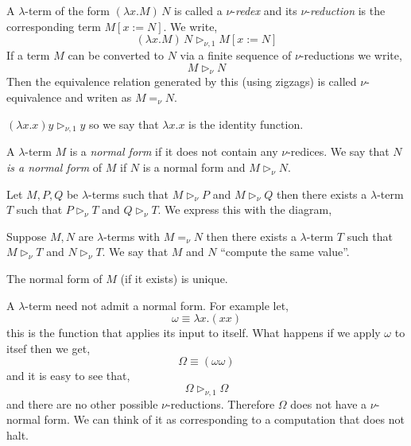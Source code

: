 \documentclass[12pt]{article}
\newcommand{\red}{\triangleright}
\newcommand{\bredo}{\red_{\nu,1}}
\newcommand{\bred}{\red_{\nu}}
\begin{document}
\begin{defn}
A $\lambda$-term of the form $(\lambda x.M) \, N$ is called a $\nu$-\textit{redex} and its $\nu$-\textit{reduction} is the corresponding term $M [x := N]$. We write,
\[ (\lambda x.M) \, N \bredo M [x := N] \]
If a term $M$ can be converted to $N$ via a finite sequence of $\nu$-reductions we write,
\[ M \bred N \]
Then the equivalence relation generated by this (using zigzags) is called $\nu$-equivalence and writen as $M =_\nu N$. 
\end{defn}

\begin{example}
$( \lambda x . x) y \bredo y$ so we say that $\lambda x . x$ is the identity function.
\end{example}

\begin{defn}
A $\lambda$-term $M$ is a \textit{normal form} if it does not contain any $\nu$-redices. We say that $N$ \textit{is a normal form} of $M$ if $N$ is a normal form and $M \bred N$.
\end{defn} 

\begin{theorem}
Let $M, P, Q$ be $\lambda$-terms such that $M \bred P$ and $M \bred Q$ then there exists a $\lambda$-term $T$ such that $P \bred T$ and $Q \bred T$. We express this with the diagram,
\begin{center}
\end{center}
\end{theorem} 

\begin{cor}
Suppose $M, N$ are $\lambda$-terms with $M =_\nu N$ then there exists a $\lambda$-term $T$ such that $M \bred T$ and $N \bred T$. We say that $M$ and $N$ ``compute the same value''.
\end{cor}

\begin{cor}
The normal form of $M$ (if it exists) is unique.
\end{cor}

\begin{example}
A $\lambda$-term need not admit a normal form. For example let,
\[ \omega \equiv \lambda x . (x x) \]
this is the function that applies its input to itself. What happens if we apply $\omega$ to itsef then we get,
\[ \Omega \equiv (\omega \omega) \]
and it is easy to see that,
\[ \Omega \bredo \Omega \]
and there are no other possible $\nu$-reductions. Therefore $\Omega$ does not have a $\nu$-normal form. We can think of it as corresponding to a computation that does not halt.
\end{example}
\end{document}

